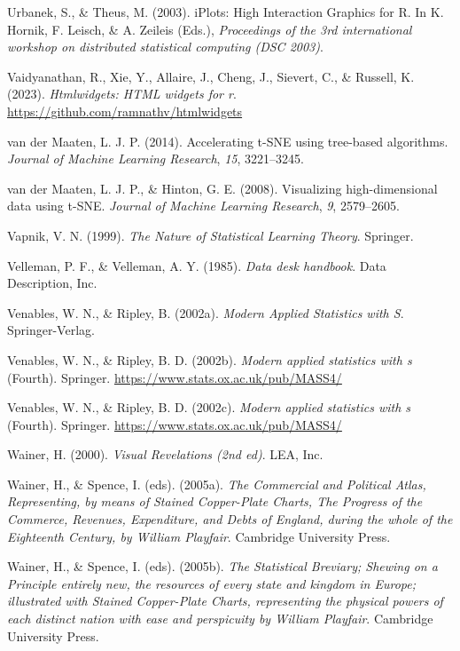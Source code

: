 \documentclass[
  letterpaper,
]{krantz}
\newlength{\cslhangindent}
\newenvironment{CSLReferences}[2] %
 {\begin{list}{}{%
  \setlength{\itemindent}{0pt}
  \setlength{\leftmargin}{0pt}
  \setlength{\parsep}{0pt}
  \ifodd #1
   \setlength{\leftmargin}{\cslhangindent}
   \setlength{\itemindent}{-1\cslhangindent}
  \fi
  \setlength{\itemsep}{#2\baselineskip}}}
 {\end{list}}
\begin{document}
\begin{CSLReferences}{1}{0}
Urbanek, S., \& Theus, M. (2003). {iPlots}: {H}igh {I}nteraction
{G}raphics for {R}. In K. Hornik, F. Leisch, \& A. Zeileis (Eds.),
\emph{Proceedings of the 3rd international workshop on distributed
statistical computing (DSC 2003)}.

Vaidyanathan, R., Xie, Y., Allaire, J., Cheng, J., Sievert, C., \&
Russell, K. (2023). \emph{Htmlwidgets: HTML widgets for r}.
\url{https://github.com/ramnathv/htmlwidgets}

van der Maaten, L. J. P. (2014). Accelerating t-SNE using tree-based
algorithms. \emph{Journal of Machine Learning Research}, \emph{15},
3221--3245.

van der Maaten, L. J. P., \& Hinton, G. E. (2008). Visualizing
high-dimensional data using t-SNE. \emph{Journal of Machine Learning
Research}, \emph{9}, 2579--2605.

Vapnik, V. N. (1999). \emph{The {N}ature of {S}tatistical {L}earning
{T}heory}. Springer.

Velleman, P. F., \& Velleman, A. Y. (1985). \emph{Data desk handbook}.
Data Description, Inc.

Venables, W. N., \& Ripley, B. (2002a). \emph{Modern {A}pplied
{S}tatistics with {S}}. Springer-Verlag.

Venables, W. N., \& Ripley, B. D. (2002b). \emph{Modern applied
statistics with s} (Fourth). Springer.
\url{https://www.stats.ox.ac.uk/pub/MASS4/}

Venables, W. N., \& Ripley, B. D. (2002c). \emph{Modern applied
statistics with s} (Fourth). Springer.
\url{https://www.stats.ox.ac.uk/pub/MASS4/}

Wainer, H. (2000). \emph{Visual {R}evelations (2nd ed)}. LEA, Inc.

Wainer, H., \& Spence, I. (eds). (2005a). \emph{The {C}ommercial and
{P}olitical {A}tlas, {R}epresenting, by means of {S}tained
{C}opper-{P}late {C}harts, {T}he {P}rogress of the {C}ommerce,
{R}evenues, {E}xpenditure, and {D}ebts of {E}ngland, during the whole of
the {E}ighteenth {C}entury, by {W}illiam {P}layfair}. Cambridge
University Press.

Wainer, H., \& Spence, I. (eds). (2005b). \emph{The {S}tatistical
{B}reviary; {S}hewing on a {P}rinciple entirely new, the resources of
every state and kingdom in {E}urope; illustrated with {S}tained
{C}opper-{P}late {C}harts, representing the physical powers of each
distinct nation with ease and perspicuity by {W}illiam {P}layfair}.
Cambridge University Press.


\end{CSLReferences}
\end{document}

